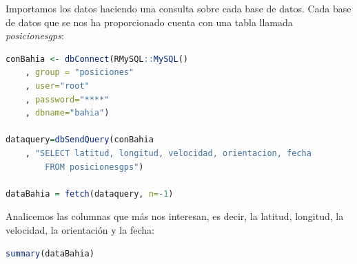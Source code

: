 \documentclass[a4paper, 12pt, spanish]{article}
\begin{document}
Importamos los datos haciendo una consulta sobre cada base de datos. Cada base de datos que se nos ha proporcionado cuenta con una tabla llamada \textit{posicionesgps}:\\

\begin{lstlisting}[language=R, columns=fullflexible, basicstyle=\small,frame=tbrl, showstringspaces=false]
conBahia <- dbConnect(RMySQL::MySQL()
	, group = "posiciones"
	, user="root"
	, password="****"
	, dbname="bahia")

dataquery=dbSendQuery(conBahia
	, "SELECT latitud, longitud, velocidad, orientacion, fecha 
		FROM posicionesgps")

dataBahia = fetch(dataquery, n=-1)
\end{lstlisting}

\smallskip

Analicemos las columnas que m\'as nos interesan, es decir, la latitud, longitud, la velocidad, la orientaci\'on y la fecha: \\

\begin{lstlisting}[language=R, basicstyle=\small, columns=fullflexible, frame=tbrl, showstringspaces=false]
summary(dataBahia)
\end{lstlisting}

\bigskip 
\end{document}
